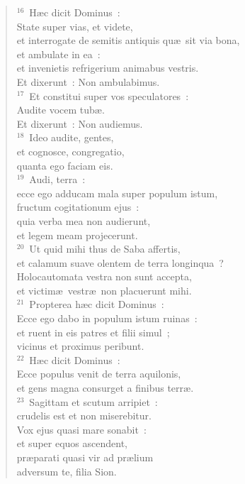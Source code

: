 \begin{verse}
${}^{16}$~H\ae c dicit Dominus~:\\ State super vias, et videte,\\ et interrogate de semitis antiquis qu\ae\ sit via bona,\\ et ambulate in ea~:\\ et invenietis refrigerium animabus vestris.\\ Et dixerunt~: Non ambulabimus.\\
${}^{17}$~Et constitui super vos speculatores~:\\ Audite vocem tub\ae .\\ Et dixerunt~: Non audiemus.\\
${}^{18}$~Ideo audite, gentes,\\ et cognosce, congregatio,\\ quanta ego faciam eis.\\
${}^{19}$~Audi, terra~:\\ ecce ego adducam mala super populum istum,\\ fructum cogitationum ejus~:\\ quia verba mea non audierunt,\\ et legem meam projecerunt.\\
${}^{20}$~Ut quid mihi thus de Saba affertis,\\ et calamum suave olentem de terra longinqua~?\\ Holocautomata vestra non sunt accepta,\\ et victim\ae\ vestr\ae\ non placuerunt mihi.\\
${}^{21}$~Propterea h\ae c dicit Dominus~:\\ Ecce ego dabo in populum istum ruinas~:\\ et ruent in eis patres et filii simul~;\\ vicinus et proximus peribunt.\\
${}^{22}$~H\ae c dicit Dominus~:\\ Ecce populus venit de terra aquilonis,\\ et gens magna consurget a finibus terr\ae .\\
${}^{23}$~Sagittam et scutum arripiet~:\\ crudelis est et non miserebitur.\\ Vox ejus quasi mare sonabit~:\\ et super equos ascendent,\\ pr\ae parati quasi vir ad pr\ae lium\\ adversum te, filia Sion.\\

\end{verse}
